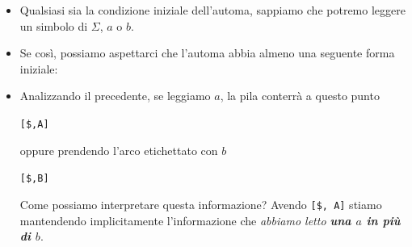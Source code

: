\documentclass[a4paper,10pt]{article}
\begin{document}
{\begin{itemize}[label=, leftmargin=0pt]
\begin{osservazioni}
        \begin{itemize}
            \item Qualsiasi sia la condizione iniziale dell'automa, sappiamo che potremo leggere un simbolo di $\Sigma$, $a$ o $b$. 
            \item Se così, possiamo aspettarci che l'automa abbia almeno una seguente forma iniziale:

            {
            \small
            \begin{center}
            \end{center}
            }

            \item Analizzando il precedente, se leggiamo $a$, la pila conterrà a questo punto 
            {
            \begin{center}
                \texttt{[\$,A]}
            \end{center}
            }
            oppure prendendo l'arco etichettato con $b$ 
            {
            \begin{center}
                \texttt{[\$,B]}
            \end{center}
            }
            Come possiamo interpretare questa informazione? Avendo \texttt{[\$, A]} stiamo mantendendo implicitamente l'informazione che \textit{abbiamo letto \textbf{una $a$ in più di $b$}}.
    

\end{itemize}
\end{osservazioni}
\end{itemize}}
\end{document}
